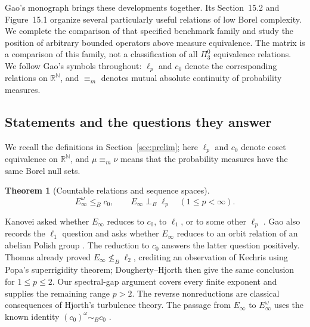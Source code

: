 \documentclass[11pt]{article}
\numberwithin{equation}{section}
\newtheorem{maintheorem}[theorem]{Theorem}
\theoremstyle{definition}
\newcommand{\N}{\mathbb N}
\newcommand{\R}{\mathbb R}
\newcommand{\meq}{\equiv_m}
\newcommand{\inc}{\mathrel{\perp_B}}
\begin{document}
Gao's monograph \cite{Gao} brings these developments together.
Its Section~15.2 and Figure~15.1 organize several particularly useful
relations of low Borel complexity. We complete the comparison of that specified benchmark family and
study the position of arbitrary bounded operators above measure
equivalence. The matrix is a comparison
of this family, not a classification of all $\Pi^0_3$ equivalence relations. We follow
Gao's symbols throughout: $\ell_p$ and $c_0$ denote the corresponding
relations on $\R^\N$, and $\meq$ denotes mutual absolute continuity
of probability measures.

\subsection{Statements and the questions they answer}
We recall the definitions in Section~\ref{sec:prelim}; here $\ell_p$
and $c_0$ denote coset equivalence on $\R^\N$, and
$\mu\equiv_m\nu$ means that the probability measures have the same
Borel null sets.

\begin{maintheorem}[Countable relations and sequence spaces]\label{main:countable}
\[
 E_\infty^\omega\leq_B c_0,
 \qquad E_\infty\inc\ell_p\quad(1\leq p<\infty).
\]
\end{maintheorem}
Kanovei asked whether $E_\infty$ reduces to $c_0$, to $\ell_1$,
or to some other $\ell_p$ \cite[Question~4.7]{Kanovei}.
Gao also records the $\ell_1$ question and asks whether $E_\infty$
reduces to an orbit relation of an abelian Polish group
\cite[Questions~2.3 and~2.5]{GaoBanach}.
The reduction to $c_0$ answers the latter question positively.
Thomas \cite[Theorem~6.12]{Thomas} already proved
$E_\infty\nleq_B\ell_2$, crediting an observation of Kechris using
Popa's superrigidity theorem; Dougherty--Hjorth \cite{DH} then give
the same conclusion for $1\leq p\leq2$.
Our spectral-gap argument covers every finite exponent and supplies
the remaining range $p>2$. The reverse nonreductions are classical
consequences of Hjorth's turbulence theory.
The passage from $E_\infty$ to $E_\infty^\omega$ uses the known
identity $(c_0)^\omega\sim_B c_0$ \cite[Lemma~7.3]{GaoBanach}.
\end{document}
